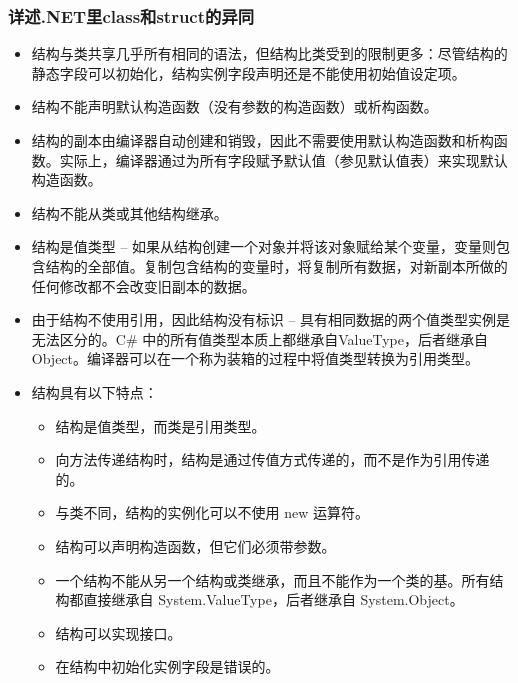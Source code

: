 \documentclass[9pt, b5paper]{article}
\begin{document}
\subsubsection{详述.NET里class和struct的异同}
\label{sec-1-2-111}
\begin{itemize}
\item 结构与类共享几乎所有相同的语法，但结构比类受到的限制更多：尽管结构的静态字段可以初始化，结构实例字段声明还是不能使用初始值设定项。
\item 结构不能声明默认构造函数（没有参数的构造函数）或析构函数。
\item 结构的副本由编译器自动创建和销毁，因此不需要使用默认构造函数和析构函数。实际上，编译器通过为所有字段赋予默认值（参见默认值表）来实现默认构造函数。
\item 结构不能从类或其他结构继承。
\item 结构是值类型 -- 如果从结构创建一个对象并将该对象赋给某个变量，变量则包含结构的全部值。复制包含结构的变量时，将复制所有数据，对新副本所做的任何修改都不会改变旧副本的数据。
\item 由于结构不使用引用，因此结构没有标识 -- 具有相同数据的两个值类型实例是无法区分的。C\# 中的所有值类型本质上都继承自ValueType，后者继承自 Object。编译器可以在一个称为装箱的过程中将值类型转换为引用类型。
\item 结构具有以下特点：
\begin{itemize}
\item 结构是值类型，而类是引用类型。
\item 向方法传递结构时，结构是通过传值方式传递的，而不是作为引用传递的。
\item 与类不同，结构的实例化可以不使用 new 运算符。
\item 结构可以声明构造函数，但它们必须带参数。
\item 一个结构不能从另一个结构或类继承，而且不能作为一个类的基。所有结构都直接继承自 System.ValueType，后者继承自 System.Object。
\item 结构可以实现接口。
\item 在结构中初始化实例字段是错误的。
\end{itemize}
\end{itemize}
\end{document}
